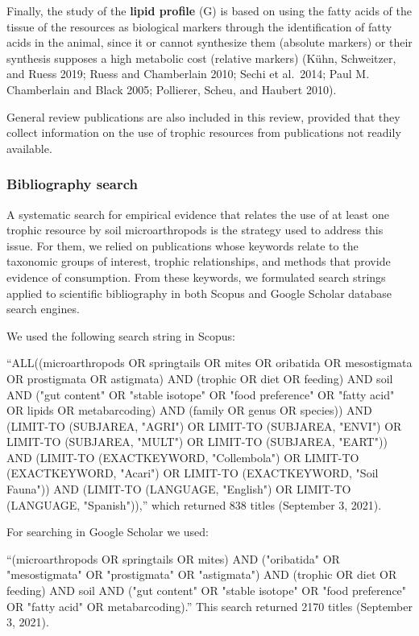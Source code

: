 \documentclass[10pt,oneside]{article}
\begin{document}
Finally, the study of the \textbf{lipid profile} (G) is based on using
the fatty acids of the tissue of the resources as biological markers
through the identification of fatty acids in the animal, since it or
cannot synthesize them (absolute markers) or their synthesis supposes a
high metabolic cost (relative markers) (Kühn, Schweitzer, and Ruess
2019; Ruess and Chamberlain 2010; Sechi et al.~2014; Paul M. Chamberlain
and Black 2005; Pollierer, Scheu, and Haubert 2010).

General review publications are also included in this review, provided
that they collect information on the use of trophic resources from
publications not readily available.

\hypertarget{bibliography-search}{%
\subsubsection{Bibliography search}\label{bibliography-search}}

A systematic search for empirical evidence that relates the use of at
least one trophic resource by soil microarthropods is the strategy used
to address this issue. For them, we relied on publications whose
keywords relate to the taxonomic groups of interest, trophic
relationships, and methods that provide evidence of consumption. From
these keywords, we formulated search strings applied to scientific
bibliography in both Scopus and Google Scholar database search engines.

We used the following search string in Scopus:

``ALL((microarthropods OR springtails OR mites OR oribatida OR
mesostigmata OR prostigmata OR astigmata) AND (trophic OR diet OR
feeding) AND soil AND ("gut content" OR "stable isotope" OR "food
preference" OR "fatty acid" OR lipids OR metabarcoding) AND (family OR
genus OR species)) AND (LIMIT-TO (SUBJAREA, "AGRI") OR LIMIT-TO
(SUBJAREA, "ENVI") OR LIMIT-TO (SUBJAREA, "MULT") OR LIMIT-TO (SUBJAREA,
"EART")) AND (LIMIT-TO (EXACTKEYWORD, "Collembola") OR LIMIT-TO
(EXACTKEYWORD, "Acari") OR LIMIT-TO (EXACTKEYWORD, "Soil Fauna")) AND
(LIMIT-TO (LANGUAGE, "English") OR LIMIT-TO (LANGUAGE, "Spanish")),''
which returned 838 titles (September 3, 2021).

For searching in Google Scholar we used:

``(microarthropods OR springtails OR mites) AND ("oribatida" OR
"mesostigmata" OR "prostigmata" OR "astigmata") AND (trophic OR diet OR
feeding) AND soil AND ("gut content" OR "stable isotope" OR "food
preference" OR "fatty acid" OR metabarcoding).'' This search returned
2170 titles (September 3, 2021).
\end{document}
